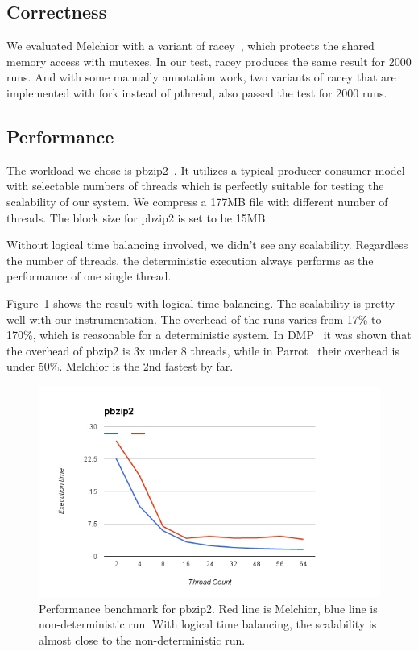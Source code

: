 \documentclass{sig-alternate}
\begin{document}
\subsection{Correctness}
We evaluated Melchior with a variant of racey~\cite{hillstress}, which protects the shared memory access with mutexes. In our test, racey produces the same result for 2000 runs. And with some manually annotation work, two variants of racey that are implemented with fork instead of pthread, also passed the test for 2000 runs.

\subsection{Performance}
The workload we chose is pbzip2~\cite{gilchrist2004parallel}. It utilizes a typical producer-consumer model with selectable numbers of threads which is perfectly suitable for testing the scalability of our system. We compress a 177MB file with different number of threads. The block size for pbzip2 is set to be 15MB. 

Without logical time balancing involved, we didn't see any scalability. Regardless the number of threads, the deterministic execution always performs as the performance of one single thread.

Figure~\ref{fig:p4-1} shows the result with logical time balancing. The scalability is pretty well with our instrumentation. The overhead of the runs varies from 17\% to 170\%, which is reasonable for a deterministic system. In DMP~\cite{devietti2009dmp} it was shown that the overhead of pbzip2 is 3x under 8 threads, while in Parrot~\cite{cui2013parrot} their overhead is under 50\%. Melchior is the 2nd fastest by far.

\begin{figure}
\centering
\includegraphics[scale=0.4]{pbzip}
\caption{Performance benchmark for pbzip2. Red line is Melchior, blue line is non-deterministic run. With logical time balancing, the scalability is almost close to the non-deterministic run.}
\label{fig:p4-1}
\end{figure}
\end{document}
